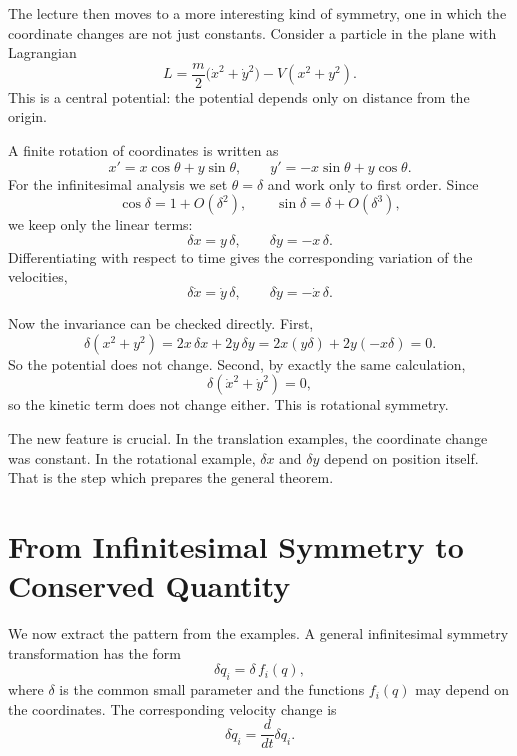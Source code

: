 The lecture then moves to a more interesting kind of symmetry, one in which the coordinate changes are not just constants. Consider a particle in the plane with Lagrangian
\begin{equation}
L=\frac{m}{2}\big(\dot x^2+\dot y^2\big)-V(x^2+y^2).
\end{equation}
This is a central potential: the potential depends only on distance from the origin.

A finite rotation of coordinates is written as
\begin{equation}
x'=x\cos\theta+y\sin\theta,
\qquad
y'=-x\sin\theta+y\cos\theta.
\end{equation}
For the infinitesimal analysis we set \(\theta=\delta\) and work only to first order. Since
\begin{equation}
\cos\delta = 1 + O(\delta^2),
\qquad
\sin\delta = \delta + O(\delta^3),
\end{equation}
we keep only the linear terms:
\begin{equation}
\delta x = y\,\delta,
\qquad
\delta y = -x\,\delta.
\end{equation}
Differentiating with respect to time gives the corresponding variation of the velocities,
\begin{equation}
\delta\dot x=\dot y\,\delta,
\qquad
\delta\dot y=-\dot x\,\delta.
\end{equation}

Now the invariance can be checked directly. First,
\begin{equation}
\delta(x^2+y^2)=2x\,\delta x+2y\,\delta y
=2x(y\delta)+2y(-x\delta)=0.
\end{equation}
So the potential does not change. Second, by exactly the same calculation,
\begin{equation}
\delta(\dot x^2+\dot y^2)=0,
\end{equation}
so the kinetic term does not change either. This is rotational symmetry.

The new feature is crucial. In the translation examples, the coordinate change was constant. In the rotational example, \(\delta x\) and \(\delta y\) depend on position itself. That is the step which prepares the general theorem.

\section{From Infinitesimal Symmetry to Conserved Quantity}

We now extract the pattern from the examples. A general infinitesimal symmetry transformation has the form
\begin{equation}
\delta q_i = \delta\,f_i(q),
\end{equation}
where \(\delta\) is the common small parameter and the functions \(f_i(q)\) may depend on the coordinates. The corresponding velocity change is
\begin{equation}
\delta\dot q_i=\frac{d}{dt}\delta q_i.
\end{equation}

